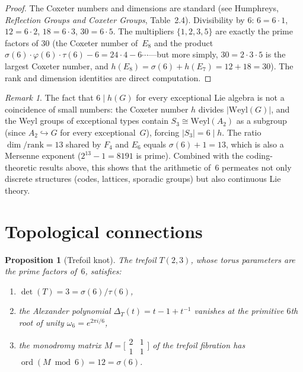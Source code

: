 \documentclass[11pt]{amsart}
\newtheorem{proposition}[theorem]{Proposition}
\theoremstyle{remark}
\newtheorem*{remark}{Remark}
\begin{document}
\begin{proof}
The Coxeter numbers and dimensions are standard
(see Humphreys, \emph{Reflection Groups and Coxeter Groups}, Table~2.4).
Divisibility by $6$: $6 = 6 \cdot 1$, $12 = 6 \cdot 2$, $18 = 6 \cdot 3$,
$30 = 6 \cdot 5$.
The multipliers $\{1, 2, 3, 5\}$ are exactly the prime factors of $30$
(the Coxeter number of~$E_8$ and the product $\sigma(6) \cdot \varphi(6) \cdot \tau(6) - 6 = 24 \cdot 4 - 6 \cdots$---but more simply,
$30 = 2 \cdot 3 \cdot 5$ is the largest Coxeter number, and
$h(E_8) = \sigma(6) + h(E_7) = 12 + 18 = 30$).
The rank and dimension identities are direct computation.
\end{proof}

\begin{remark}
The fact that $6 \mid h(G)$ for every exceptional Lie algebra
is not a coincidence of small numbers: the Coxeter number
$h$ divides $|\mathrm{Weyl}(G)|$, and the Weyl groups of
exceptional types contain $S_3 \cong \mathrm{Weyl}(A_2)$
as a subgroup (since $A_2 \hookrightarrow G$ for every exceptional~$G$),
forcing $|S_3| = 6 \mid h$.
The ratio $\dim/\mathrm{rank} = 13$ shared by $F_4$ and $E_6$ equals
$\sigma(6) + 1 = 13$, which is also a Mersenne exponent
($2^{13} - 1 = 8191$ is prime).
Combined with the coding-theoretic results above, this shows that
the arithmetic of~$6$ permeates not only discrete structures
(codes, lattices, sporadic groups) but also continuous Lie theory.
\end{remark}

\section{Topological connections}

\begin{proposition}[Trefoil knot]\label{prop:trefoil}
The trefoil $T(2,3)$, whose torus parameters are the prime factors of~$6$,
satisfies:
\begin{enumerate}
\item[\textup{(i)}] $\det(T) = 3 = \sigma(6)/\tau(6)$,
\item[\textup{(ii)}] the Alexander polynomial
  $\Delta_T(t) = t - 1 + t^{-1}$ vanishes at the primitive
  $6$th root of unity $\omega_6 = e^{2\pi i/6}$,
\item[\textup{(iii)}] the monodromy matrix
  $M = \bigl[\begin{smallmatrix} 2 & 1 \\ 1 & 1 \end{smallmatrix}\bigr]$
  of the trefoil fibration has
  $\operatorname{ord}(M \bmod 6) = 12 = \sigma(6)$.
\end{enumerate}
\end{proposition}
\end{document}
